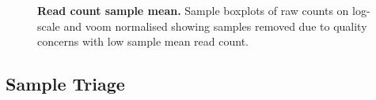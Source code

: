 \begin{figure}[!ht]
         \begin{center}
%
%
    \end{center}
  \caption[Read count sample mean]{\textbf{Read count sample mean.} Sample boxplots of raw counts on log-scale and voom normalised showing samples removed due to quality concerns with low sample mean read count.}
\label{fig:boxplot}
\end{figure}


\subsection{Sample Triage} \label{methods:sample_qc}


